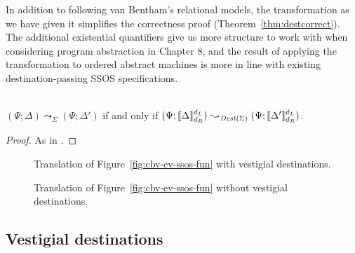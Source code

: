 In addition to following van Bentham's relational models, the
transformation as we have given it simplifies the correctness
proof (Theorem~\ref{thm:destcorrect}). The additional existential
quantifiers give us more structure to work with when considering
program abstraction in Chapter 8, and the result of applying the
transformation to ordered abstract machines is more in line with 
existing destination-passing SSOS specifications.



\bigskip
\begin{theorem}~\\\label{thm:destcorrect}
$(\Psi; \Delta) \leadsto_\Sigma (\Psi; \Delta')$ if and only if
$(\Psi; \llbracket \Delta \rrbracket^{d_L}_{d_R}) \leadsto_{{\it Dest}(\Sigma)}
 (\Psi; \llbracket \Delta' \rrbracket^{d_L}_{d_R})$.
\end{theorem}

\begin{proof}
As in \cite[Theorem 2]{simmons11logical}.
\end{proof}

\begin{figure}
\caption{Translation of Figure~\ref{fig:cbv-ev-ssos-fun} with vestigial destinations.}
\label{fig:dest-vestige}
\end{figure}

\begin{figure}
\caption{Translation of Figure~\ref{fig:cbv-ev-ssos-fun} without vestigial destinations.}
\label{fig:dest-cbv}
\end{figure}

\subsection{Vestigial destinations}

